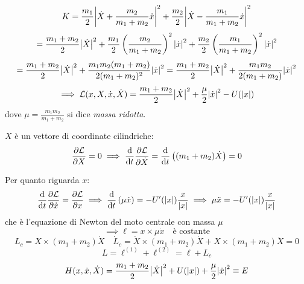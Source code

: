 \begin{equation*}
    K = \frac{m_1}{2}\abs{\dot{X} + \frac{m_2}{m_1+m_2}\dot{x}}^2 
    + \frac{m_2}{2}\abs{\dot{X} - \frac{m_1}{m_1+m_2}\dot{x}}^2
\end{equation*}
\begin{equation*}
    = \frac{m_1+m_2}{2}\abs{\dot{X}}^2 + \frac{m_1}{2}\left( \frac{m_2}{m_1+m_2} \right)^2\abs{\dot{x}}^2
    + \frac{m_2}{2}\left( \frac{m_1}{m_1+m_2} \right)^2\abs{\dot{x}}^2
\end{equation*}
\begin{equation}
    = \frac{m_1+m_2}{2}\abs{\dot{X}}^2 + \frac{m_1m_2(m_1+m_2)}{2(m_1+m_2)^2}\abs{\dot{x}}^2
    = \frac{m_1+m_2}{2}\abs{\dot{X}}^2 + \frac{m_1m_2}{2(m_1+m_2)}\abs{\dot{x}}^2
\end{equation}
\begin{equation}
    \implies \mathcal{L}(x,X,\dot{x},\dot{X}) = \frac{m_1+m_2}{2}\abs{\dot{X}}^2 + \frac{\mu}{2}\abs{\dot{x}}^2 - U(\abs{x})
\end{equation}
dove $\mu = \frac{m_1 m_2}{m_1+m_2}$ si dice \textit{massa ridotta}.

\begin{remark}
    $X$ è un vettore di coordinate cilindriche:
    \begin{equation}
        \pdv{\mathcal{L}}{X}=0\implies \dv{t}\pdv{\mathcal{L}}{\dot{X}}= \dv{t}\left( (m_1+m_2)\dot{X} \right)  =0
    \end{equation}
\end{remark}

Per quanto riguarda $x $:
\begin{equation}
    \dv{t}\pdv{\mathcal{L}}{\dot{x}}= \pdv{\mathcal{L}}{x}\implies
    \dv{t}\left( \mu \dot{x} \right)= - U'(\abs{x})\frac{x}{\abs{x}}\implies
    \mu\ddot{x} = - U'(\abs{x})\frac{x}{\abs{x}}
\end{equation}
che è l'equazione di Newton del moto centrale con massa $\mu$
\begin{equation}
    \implies \ell = x \times \mu \dot{x} \quad \text{è costante}
\end{equation}
\begin{equation}
    L_c = X \times (m_1+m_2) \dot{X}\quad 
    \dot{L}_c = \dot{X}\times(m_1+m_2)\dot{X}+ X \times(m_1+m_2)\ddot{X}= 0 
\end{equation}
\begin{equation}
    L = \ell^{(1)}  + \ell^{(2)}    = \ell + L_c
\end{equation}
\begin{equation}
    H (x,\dot{x}, \dot{X})= \frac{m_1+m_2}{2}\abs{\dot{X}}^2+ U(\abs{x})+ \frac{\mu}{2}\abs{\dot{x}}^2 \equiv E
\end{equation}


